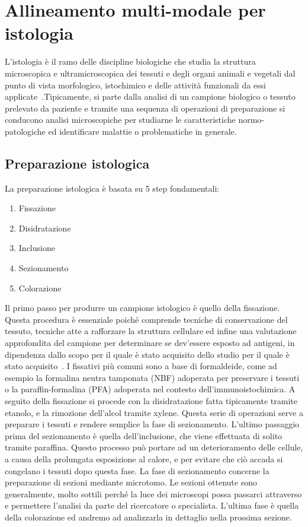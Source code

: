 \chapter{Allineamento multi-modale per istologia}
\frenchspacing
\label{chap:histology}
L'istologia è il ramo delle discipline biologiche che studia la struttura microscopica e ultramicroscopica dei tessuti e degli organi animali e vegetali dal punto di vista morfologico, istochimico e delle attività funzionali da essi applicate~\cite{Istologia}.Tipicamente, si parte dalla analisi di un campione biologico o tessuto prelevato da paziente e tramite una sequenza di operazioni di preparazione si conducono analisi microscopiche per studiarne le caratteristiche normo-patologiche ed identificare malattie o problematiche in generale.
\section{Preparazione istologica}
La preparazione istologica è basata su 5 step fondamentali:
\begin{enumerate}
    \item Fissazione
    \item Disidratazione
    \item Inclusione
    \item Sezionamento
    \item Colorazione
\end{enumerate} \hfill \break
\noindent Il primo passo per produrre un campione istologico è quello della fissazione. Questa procedura è essenziale poiché comprende tecniche di conservazione del tessuto, tecniche atte a rafforzare la struttura cellulare ed infine una valutazione approfondita del campione per determinare se dev'essere esposto ad antigeni, in dipendenza dallo scopo per il quale è stato acquisito dello studio per il quale è stato acquisito~\cite{Alturkistani2015-bz}. \hfill \break
\noindent I fissativi più comuni sono a base di formaldeide, come ad esempio la formalina neutra tamponata (NBF) adoperata per preservare i tessuti o la paraffin-formalina (PFA) adoperata nel contesto dell'immunoistochimica.
A seguito della fissazione si procede con la disidratazione fatta tipicamente tramite etanolo, e la rimozione dell'alcol tramite xylene. Questa serie di operazioni serve a preparare i tessuti e rendere semplice la fase di sezionamento. \hfill \break
\noindent L'ultimo passaggio prima del sezionamento è quella dell'inclusione, che viene effettuata di solito tramite paraffina. Questo processo può portare ad un deterioramento delle cellule, a causa della prolungata esposizione al calore, e per evitare che ciò accada si congelano i tessuti dopo questa fase. \hfill \break
\noindent La fase di sezionamento concerne la preparazione di sezioni mediante microtomo. Le sezioni ottenute sono generalmente, molto sottili perché la luce dei microscopi possa passarci attraverso e permettere l'analisi da parte del ricercatore o specialista.
L'ultima fase è quella della colorazione ed andremo ad analizzarla in dettaglio nella prossima sezione.
